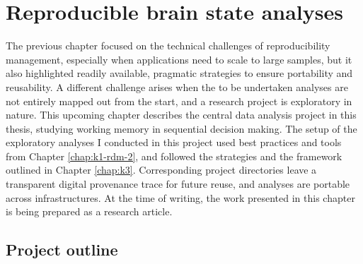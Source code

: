 

\chapter{Reproducible brain state analyses}
\label{chap:k4}

The previous chapter focused on the technical challenges of reproducibility management, especially when applications need to scale to large samples, but it also highlighted readily available, pragmatic strategies to ensure portability and reusability.
A different challenge arises when the to be undertaken analyses are not entirely mapped out from the start, and a research project is exploratory in nature.
This upcoming chapter describes the central data analysis project in this thesis, studying working memory in sequential decision making.
The setup of the exploratory analyses I conducted in this project used best practices and tools from Chapter \ref{chap:k1-rdm-2}, and followed the strategies and the framework outlined in Chapter \ref{chap:k3}.
Corresponding project directories leave a transparent digital provenance trace for future reuse, and analyses are portable across infrastructures.
At the time of writing, the work presented in this chapter is being prepared as a research article.

\section{Project outline}

